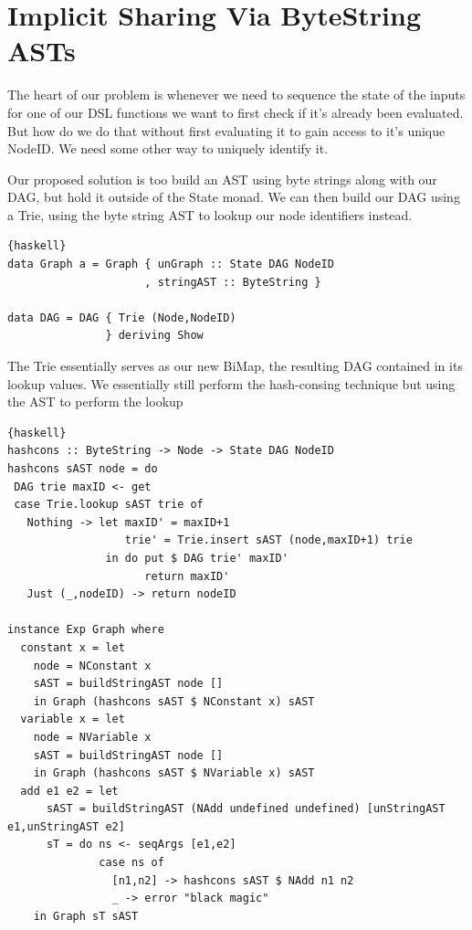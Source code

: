 \documentclass[runningheads]{llncs}
\begin{document}
\section{Implicit Sharing Via ByteString ASTs}

The heart of our problem is whenever we need to sequence the state of the inputs
for one of our DSL functions we want to first check if it's already been
evaluated. But how do we do that without first evaluating it to gain access to
it's unique NodeID. We need some other way to uniquely identify it.

Our proposed solution is too build an AST using byte strings along with our
DAG, but hold it outside of the State monad. We can then build our DAG using a
Trie, using the byte string AST to lookup our node identifiers instead.

\begin{lstlisting}{haskell}
data Graph a = Graph { unGraph :: State DAG NodeID
                     , stringAST :: ByteString }

data DAG = DAG { Trie (Node,NodeID)
               } deriving Show
\end{lstlisting}

The Trie essentially serves as our new BiMap, the resulting DAG contained in its
lookup values. We essentially still perform the hash-consing technique but using
the AST to perform the lookup
\begin{lstlisting}{haskell}
hashcons :: ByteString -> Node -> State DAG NodeID
hashcons sAST node = do
 DAG trie maxID <- get
 case Trie.lookup sAST trie of
   Nothing -> let maxID' = maxID+1
                  trie' = Trie.insert sAST (node,maxID+1) trie
               in do put $ DAG trie' maxID'
                     return maxID'
   Just (_,nodeID) -> return nodeID

instance Exp Graph where
  constant x = let
    node = NConstant x
    sAST = buildStringAST node []
    in Graph (hashcons sAST $ NConstant x) sAST
  variable x = let
    node = NVariable x
    sAST = buildStringAST node []
    in Graph (hashcons sAST $ NVariable x) sAST
  add e1 e2 = let
      sAST = buildStringAST (NAdd undefined undefined) [unStringAST e1,unStringAST e2]
      sT = do ns <- seqArgs [e1,e2]
              case ns of
                [n1,n2] -> hashcons sAST $ NAdd n1 n2
                _ -> error "black magic"
    in Graph sT sAST

\end{lstlisting}
\end{document}
